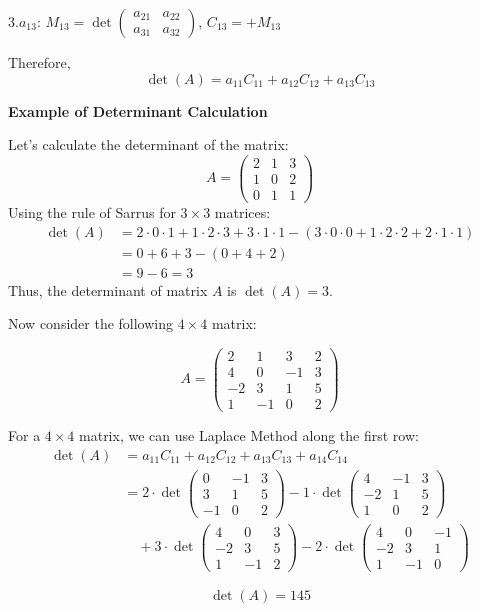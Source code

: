 3.\(a_{13}\):  \(M_{13} = \det \begin{pmatrix} a_{21} & a_{22} \\ a_{31} & a_{32} \end{pmatrix}\),  \(C_{13} = +M_{13}\)

Therefore,
\[
\det(A) = a_{11}C_{11} + a_{12}C_{12} + a_{13}C_{13}
\]


\textbf{Example of Determinant Calculation}

Let's calculate the determinant of the matrix:
\begin{equation*}
A =
\begin{pmatrix}
2 & 1 & 3 \\
1 & 0 & 2 \\
0 & 1 & 1
\end{pmatrix}
\end{equation*}
Using the rule of Sarrus for \(3 \times 3\) matrices:
\begin{align*}
\det(A) &= 2 \cdot 0 \cdot 1 + 1 \cdot 2 \cdot 3 + 3 \cdot 1 \cdot 1 - (3 \cdot 0 \cdot 0 + 1 \cdot 2 \cdot 2 + 2 \cdot 1 \cdot 1) \\
&= 0 + 6 + 3 - (0 + 4 + 2) \\
&= 9 - 6 = 3
\end{align*}
 Thus, the determinant of matrix \(A\) is \(\det(A) = 3\).

 Now consider the following \(4 \times 4\) matrix:

\begin{equation*}
A = 
\begin{pmatrix}
2 & 1 & 3 & 2 \\
4 & 0 & -1 & 3 \\
-2 & 3 & 1 & 5 \\
1 & -1 & 0 & 2
\end{pmatrix}
\end{equation*}

For a \(4 \times 4\) matrix, we can use Laplace Method along the first row:
\begin{align*}
\det(A) &= a_{11}C_{11} + a_{12}C_{12} + a_{13}C_{13} + a_{14}C_{14} \\
&= 2 \cdot \det\begin{pmatrix} 0 & -1 & 3 \\ 3 & 1 & 5 \\ -1 & 0 & 2 \end{pmatrix} 
- 1 \cdot \det\begin{pmatrix} 4 & -1 & 3 \\ -2 & 1 & 5 \\ 1 & 0 & 2 \end{pmatrix} \\
&\quad + 3 \cdot \det\begin{pmatrix} 4 & 0 & 3 \\ -2 & 3 & 5 \\ 1 & -1 & 2 \end{pmatrix} 
- 2 \cdot \det\begin{pmatrix} 4 & 0 & -1 \\ -2 & 3 & 1 \\ 1 & -1 & 0 \end{pmatrix}
\end{align*}

\[\det(A) = 145\]

\newpage
